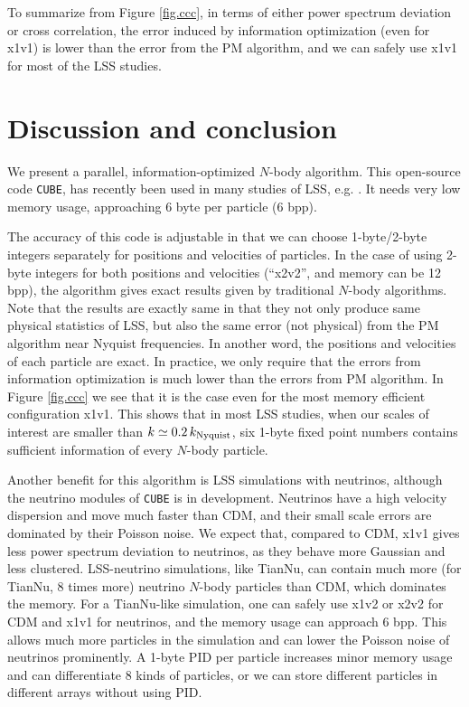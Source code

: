 \documentclass[10pt,twocolumn,preprint]{emulateapj}
\begin{document}
To summarize from Figure \ref{fig.ccc}, in terms of either power spectrum deviation or cross correlation, the error induced by information optimization (even for x1v1) is lower than the error from the PM algorithm, and we can safely use x1v1 for most of the LSS studies.

\section{Discussion and conclusion}\label{s.discussion}
We present a parallel, information-optimized $N$-body algorithm. This open-source code {\tt CUBE}, has recently been used in many studies of LSS, e.g. \cite{2017PhRvD..95d3501Y,2017ApJ...841L..29W,2017MNRAS.469.1968P}. It needs very low memory usage, approaching 6 byte per particle (6 bpp).

The accuracy of this code is adjustable in that we can choose 1-byte/2-byte integers separately for positions and velocities of particles. In the case of using 2-byte integers for both positions and velocities (``x2v2'', and memory can be 12 bpp), the algorithm gives exact results given by traditional $N$-body algorithms. Note that the results are exactly same in that they not only produce same physical statistics of LSS, but also the same error (not physical) from the PM algorithm near Nyquist frequencies. In another word, the positions and velocities of each particle are exact. In practice, we only require that the errors from information optimization is much lower than the errors from PM algorithm. In Figure \ref{fig.ccc} we see that it is the case even for the most memory efficient configuration x1v1. This shows that in most LSS studies, when our scales of interest are smaller than $k\simeq 0.2\,k_{\rm Nyquist}$, six 1-byte fixed point numbers contains sufficient information of every $N$-body particle.

Another benefit for this algorithm is LSS simulations with neutrinos, although the neutrino modules of {\tt CUBE} is in development. Neutrinos have a high velocity dispersion and move much faster than CDM, and their small scale errors are dominated by their Poisson noise. We expect that, compared to CDM, x1v1 gives less power spectrum deviation to neutrinos, as they behave more Gaussian and less clustered. LSS-neutrino simulations, like TianNu, can contain much more (for TianNu, 8 times more) neutrino $N$-body particles than CDM, which dominates the memory. For a TianNu-like simulation, one can safely use x1v2 or x2v2 for CDM and x1v1 for neutrinos, and the memory usage can approach 6 bpp. This allows much more particles in the simulation and can lower the Poisson noise of neutrinos prominently. A 1-byte PID per particle increases minor memory usage and can differentiate 8 kinds of particles, or we can store different particles in different arrays without using PID.
\end{document}
